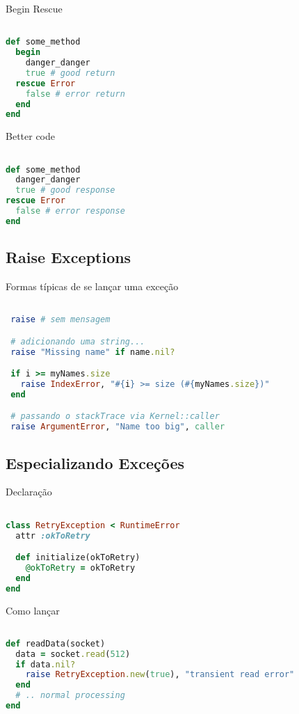 \documentclass[serif,mathserif]{article}
\begin{document}
Begin Rescue

\begin{lstlisting}[language=ruby]

def some_method
  begin
    danger_danger
    true # good return
  rescue Error
    false # error return
  end
end
\end{lstlisting}

Better code

\begin{lstlisting}[language=ruby]

def some_method
  danger_danger
  true # good response
rescue Error
  false # error response
end
\end{lstlisting}

\subsection{Raise Exceptions}

Formas típicas de se lançar uma exceção

\begin{lstlisting}[language=ruby]

 raise # sem mensagem

 # adicionando uma string...
 raise "Missing name" if name.nil?

 if i >= myNames.size
   raise IndexError, "#{i} >= size (#{myNames.size})"
 end

 # passando o stackTrace via Kernel::caller
 raise ArgumentError, "Name too big", caller
\end{lstlisting}

\subsection{Especializando Exceções}

Declaração

\begin{lstlisting}[language=ruby]

class RetryException < RuntimeError
  attr :okToRetry

  def initialize(okToRetry)
    @okToRetry = okToRetry
  end
end
\end{lstlisting}

Como lançar

\begin{lstlisting}[language=ruby]

def readData(socket)
  data = socket.read(512)
  if data.nil?
    raise RetryException.new(true), "transient read error"
  end
  # .. normal processing
end
\end{lstlisting}
\end{document}
